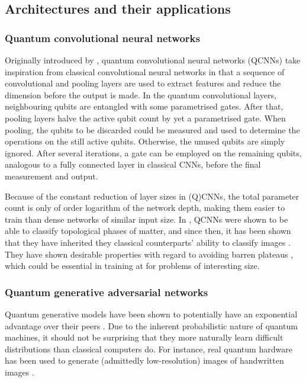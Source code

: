 \subsection{Architectures and their applications}
\subsubsection{Quantum convolutional neural networks}
Originally introduced by \textcite{cong2019}, quantum convolutional neural networks (QCNNs) take inspiration from classical convolutional neural networks in that a sequence of convolutional and pooling layers are used to extract features and reduce the dimension before the output is made.
In the quantum convolutional layers, neighbouring qubits are entangled with some parametrised gates.
After that, pooling layers halve the active qubit count by yet a parametrised gate.
When pooling, the qubits to be discarded could be measured and used to determine the operations on the still active qubits.
Otherwise, the unused qubits are simply ignored.
After several iterations, a gate can be employed on the remaining qubits, analogous to a fully connected layer in classical CNNs, before the final measurement and output.

Because of the constant reduction of layer sizes in (Q)CNNs, the total parameter count is only of order logarithm of the network depth, making them easier to train than dense networks of similar input size.
In \cite{cong2019}, QCNNs were shown to be able to classify topological phases of matter, and since then, it has been shown that they have inherited they classical counterparts' ability to classify images \cite{oh2020}.
They have shown desirable properties with regard to avoiding barren plateaus \cite{pesah2021}, which could be essential in training at for problems of interesting size.

\subsubsection{Quantum generative adversarial networks}
Quantum generative models have been shown to potentially have an exponential advantage over their peers \cite{gao2018}.
Due to the inherent probabilistic nature of quantum machines, it should not be surprising that they more naturally learn difficult distributions than classical computers do.
For instance, real quantum hardware has been used to generate (admittedly low-resolution) images of handwritten images \cite{huang2021}.


